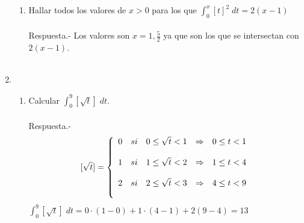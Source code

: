 \begin{enumerate}
\begin{enumerate}[\bfseries (a)]
	\item Hallar todos los valores de $x>0$ para los que $\displaystyle\int_{0}^{x} [t]^2 \; dt=2(x-1)$\\\\
	    Respuesta.-\; Los valores son $x=1,\frac{5}{2}$ ya que son los que se intersectan con $2(x-1)$.\\\\ 

    \end{enumerate}

    \item 
	\begin{enumerate}[\bfseries (a)]
		
	    \item Calcular $\displaystyle\int_{0}^{9} [\sqrt{t}] \; dt$.\\\\
		Respuesta.-\;
		$$[\sqrt{t}] = \left\{ \begin{array}{c c l c r}
		    0 & si & 0\leq \sqrt{t}<1 & \Rightarrow & 0\leq t < 1\\
		    \\1 & si & 1 \leq \sqrt{t} < 2 & \Rightarrow & 1 \leq t < 4\\
		    \\2 & si & 2 \leq \sqrt{t}<3 & \Rightarrow & 4\leq t < 9\\\\
		\end{array}\right.$$
		    $\displaystyle\int_{0}^{9} \left[\sqrt{t}\right]\; dt = 0\cdot(1-0) + 1\cdot (4-1) + 2(9-4)=13$\\\\


\end{enumerate}
\end{enumerate}
